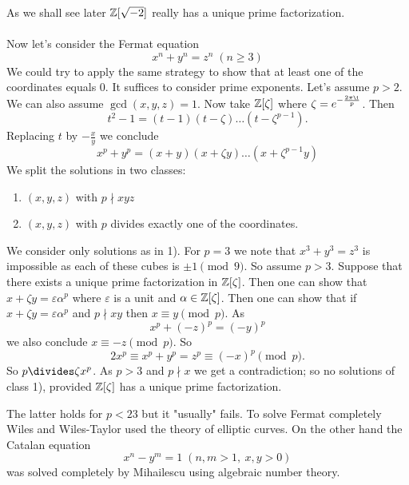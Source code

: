 \documentclass[NumTh.tex]{subfiles}
\begin{document}
As we shall see later $\mathbb{Z}[\sqrt{-2}]$ really has a unique prime factorization.\\
\\
Now let's consider the Fermat equation
\[ x^n + y^n = z^n \; (n\geq 3) \]
We could try to apply the same strategy to show that at least one of the coordinates equals $0$.
It suffices to consider prime exponents. Let's assume $p > 2$.
We can also assume $\gcd(x,y,z) = 1$.
Now take $\mathbb{Z}[\zeta]$ where $\zeta = e^{-\frac{2\pi \i}{p}}$.
Then
\[ t^2 -1 = (t-1)(t-\zeta)\dots (t-\zeta^{p-1}) \text{.} \]
Replacing $t$ by $- \frac{x}{y}$ we conclude
\[ x^p + y^p = (x+y)(x + \zeta y) \dots (x + \zeta^{p-1}y) \]
We split the solutions in two classes:
\begin{enumerate}
  \item $(x,y,z)$ with $p \nmid xyz$
  \item $(x,y,z)$ with $p$ divides exactly one of the coordinates.
\end{enumerate}
We consider only solutions as in 1).
For $p = 3$ we note that $x^3 + y^3 = z^3$ is impossible as each of these cubes is $\pm 1 \pmod 9$.
So assume $p>3$.
Suppose that there exists a unique prime factorization in $\mathbb{Z}[\zeta]$. Then one can show that $x + \zeta y = \varepsilon \alpha^p$ where $\varepsilon$ is a unit and $\alpha \in \mathbb{Z}[\zeta]$.
Then one can show that if $x+ \zeta y = \varepsilon \alpha^p$ and $p \nmid xy$ then $x \equiv y \pmod p$.
As 
\[ x^p + (-z)^p = (-y)^p\]
we also conclude $x  \equiv -z \pmod p$.
So 
\[ 2x^p \equiv x^p + y^p = z^p \equiv (-x)^p \pmod p \text{.} \]
So $p \divides \zeta x^p$.
As $p > 3$ and $p \nmid x$ we get a contradiction; so no solutions of class 1), provided $\mathbb{Z}[\zeta]$ has a unique prime factorization.

The latter holds for $p < 23$ but it "usually" fails.
To solve Fermat completely Wiles and Wiles-Taylor used the theory of elliptic curves.
On the other hand the Catalan equation
\[ x^n - y^m = 1 \; (n,m > 1,\:x,y >0) \]
was solved completely by Mihailescu using algebraic number theory.
\end{document}
